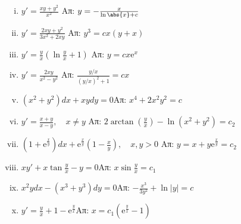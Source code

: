 \documentclass[a4paper,table]{report}
\begin{document}
\begin{enumerate}
    \begin{enumerate}[i)]
      \item $ y' = \frac{xy+y^{2}}{x^{2}} $ %
        \hfill Απ: $ y= - \frac{x}{\ln{\abs{x} } + c} $ 
      \item $ y' = \frac{2xy+y^{2}}{3x^{2}+2xy} $ %
        \hfill Απ: $ y^{3}=cx(y+x) $ 
      \item $ y' = \frac{y}{x} (\ln{\frac{y}{x}} +1) $ %
        \hfill Απ: $ y=cx \mathrm{e}^{x} $ 
      \item $ y' = \frac{2xy}{x^{2}-y^{2}} $ %
        \hfill Απ: $ \frac{y/x}{(y/x)^{2}+1} = cx $ 
      \item $(x^2+y^2)dx+xydy=0$\hfill Απ: $x^4+2x^2y^2=c$
      \item $y'=\frac{x+y}{x-y}, \quad x\neq y$
        \hfill Απ: $2\arctan (\frac{y}{x})-\ln (x^2+y^2)=c_2$
      \item $(1+ \mathrm{e}^{\frac{x}{y}})dx+ \mathrm{e}^{\frac{x}{y}}(1-\frac{x}{y}), 
        \quad x,y>0$
        \hfill Απ: $y=x+y \mathrm{e}^{\frac{x}{y}}=c_2$
      \item $xy'+x\tan \frac{y}{x}-y=0$\hfill Απ: $x\sin \frac{y}{x}=c_1$
      \item $x^2ydx-(x^3+y^3)dy=0$\hfill Απ: $-\frac{x^3}{3y^2}+\ln|y|=c$
      \item $y'=\frac{y}{x}+1- \mathrm{e}^{\frac{y}{x}}$\hfill Απ: $x=c_1(
        \mathrm{e}^{\frac{y}{x}}-1)$
    \end{enumerate}




\end{enumerate}
\end{document}

